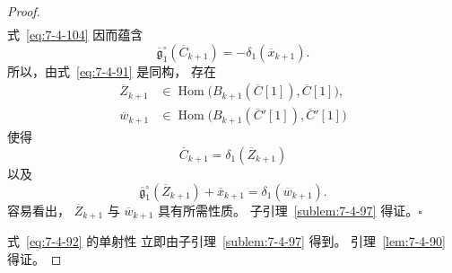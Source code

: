 \begin{proof}
\[\begin{aligned}
\end{aligned}
\]
式~\eqref{eq:7-4-104} 因而蕴含
\begin{equation}
\overline{\mathfrak g}^{\circ}_1(\overline C_{k+1})
=-\delta_1(\overline x_{k+1}).
\tag{7.4.105}\label{eq:7-4-105}
\end{equation}
所以，由式~\eqref{eq:7-4-91} 是同构，
存在
\[
\begin{aligned}
\overline Z_{k+1}&\in
\operatorname{Hom}\bigl(
B_{k+1}(\overline C[1]),
\overline C[1]
\bigr),\\
\overline w_{k+1}&\in
\operatorname{Hom}\bigl(
B_{k+1}(\overline C'[1]),
\overline C'[1]
\bigr)
\end{aligned}
\]
使得
\[
\overline C_{k+1}=\delta_1(\overline Z_{k+1})
\]
以及
\[
\overline{\mathfrak g}^{\circ}_1(\overline Z_{k+1})
+\overline x_{k+1}
=\delta_1(\overline w_{k+1}).
\]
容易看出，
$\overline Z_{k+1}$ 与 $\overline w_{k+1}$
具有所需性质。
子引理~\ref{sublem:7-4-97} 得证。\hfill$\square$

式~\eqref{eq:7-4-92} 的单射性
立即由子引理~\ref{sublem:7-4-97} 得到。
引理~\ref{lem:7-4-90} 得证。
\end{proof}
